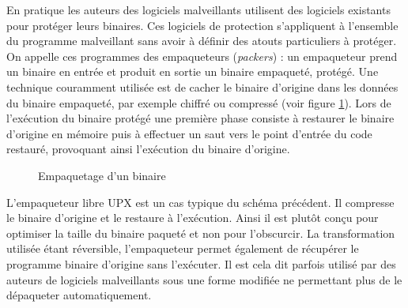 En pratique les auteurs des logiciels malveillants utilisent des logiciels existants pour protéger leurs binaires.
Ces logiciels de protection s'appliquent à l'ensemble du programme malveillant sans avoir à définir des atouts particuliers à protéger. On appelle ces programmes des empaqueteurs (\emph{packers}) : un empaqueteur prend un binaire en entrée et produit en sortie un binaire empaqueté, protégé. Une technique couramment utilisée est de cacher le binaire d'origine dans les données du binaire empaqueté, par exemple chiffré ou compressé (voir figure \ref{fig:packer}). Lors de l'exécution du binaire protégé une première phase consiste à restaurer le binaire d'origine en mémoire puis à effectuer un saut vers le point d'entrée du code restauré, provoquant ainsi l'exécution du binaire d'origine.

\begin{figure}[h]
\begin{center}
\end{center}
\caption{Empaquetage d'un binaire}
\label{fig:packer}
\end{figure}

L'empaqueteur libre UPX \cite{UPX} est un cas typique du schéma précédent. Il compresse le binaire d'origine et le restaure à l'exécution. Ainsi il est plutôt conçu pour optimiser la taille du binaire paqueté et non pour l'obscurcir. La transformation utilisée étant réversible, l'empaqueteur permet également de récupérer le programme binaire d'origine sans l'exécuter. Il est cela dit parfois utilisé par des auteurs de logiciels malveillants sous une forme modifiée ne permettant plus de le dépaqueter automatiquement.


